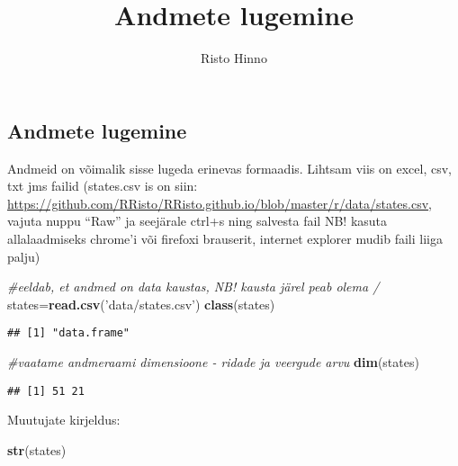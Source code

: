 \documentclass[]{article}
\title{Andmete lugemine}
\author{Risto Hinno}
\date{\begin{enumerate}
\def\labelenumi{\arabic{enumi}.}
\setcounter{enumi}{11}
\tightlist
\item
  jaanuar 2019
\end{enumerate}}
\newenvironment{Shaded}{\begin{snugshade}}{\end{snugshade}}
\newcommand{\KeywordTok}[1]{\textcolor[rgb]{0.13,0.29,0.53}{\textbf{#1}}}
\newcommand{\StringTok}[1]{\textcolor[rgb]{0.31,0.60,0.02}{#1}}
\newcommand{\CommentTok}[1]{\textcolor[rgb]{0.56,0.35,0.01}{\textit{#1}}}
\newcommand{\NormalTok}[1]{#1}
\begin{document}
\maketitle

\subsection{Andmete lugemine}\label{andmete-lugemine}

Andmeid on võimalik sisse lugeda erinevas formaadis. Lihtsam viis on
excel, csv, txt jms failid (states.csv is on siin:
\url{https://github.com/RRisto/RRisto.github.io/blob/master/r/data/states.csv},
vajuta nuppu ``Raw'' ja seejärale ctrl+s ning salvesta fail NB! kasuta
allalaadmiseks chrome'i või firefoxi brauserit, internet explorer mudib
faili liiga palju)

\begin{Shaded}
\begin{Highlighting}[]
\CommentTok{#eeldab, et andmed on data kaustas, NB! kausta järel peab olema /}
\NormalTok{states=}\KeywordTok{read.csv}\NormalTok{(}\StringTok{'data/states.csv'}\NormalTok{)}
\KeywordTok{class}\NormalTok{(states)}
\end{Highlighting}
\end{Shaded}

\begin{verbatim}
## [1] "data.frame"
\end{verbatim}

\begin{Shaded}
\begin{Highlighting}[]
\CommentTok{#vaatame andmeraami dimensioone - ridade ja veergude arvu}
\KeywordTok{dim}\NormalTok{(states)}
\end{Highlighting}
\end{Shaded}

\begin{verbatim}
## [1] 51 21
\end{verbatim}

Muutujate kirjeldus:

\begin{Shaded}
\begin{Highlighting}[]
\KeywordTok{str}\NormalTok{(states)}
\end{Highlighting}
\end{Shaded}
\end{document}
